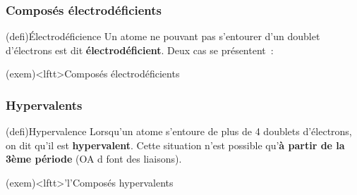 \documentclass[../../main/main.tex]{subfiles}
\begin{document}
\subsubsection{Composés électrodéficients}
\begin{tcb*}(defi){Électrodéficience}
	Un atome ne pouvant pas s'entourer d'un doublet d'électrons est dit
	\textbf{électrodéficient}. Deux cas se présentent~:
	\smallbreak
	\begin{isd}[sidebyside align=top]
		\tcblower
	\end{isd}
\end{tcb*}

\begin{tcb*}(exem)<lftt>{Composés électrodéficients}
	\vspace{-15pt}
\end{tcb*}

\subsubsection{Hypervalents}

\begin{tcb*}(defi){Hypervalence}
	Lorsqu'un atome s'entoure de plus de 4 doublets d'électrons, on dit qu'il
	est \textbf{hypervalent}. Cette situation n'est possible qu'\textbf{à partir
		de la 3ème période} (OA d font des liaisons).
\end{tcb*}

\begin{tcb*}(exem)<lftt>'l'{Composés hypervalents}
	\vspace{-15pt}
\end{tcb*}
\end{document}
